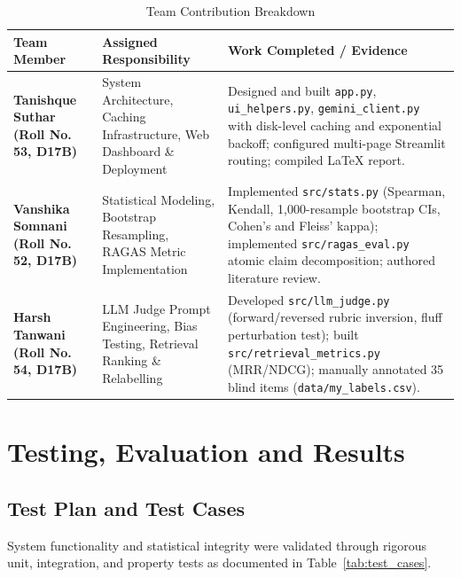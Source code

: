 \documentclass[11pt,a4paper]{article}
\renewcommand{\arraystretch}{1.2}
\begin{document}
\begin{table}[htbp]
\centering
\caption{Team Contribution Breakdown}
\label{tab:team_contribution}
\footnotesize
\renewcommand{\arraystretch}{1.25}
\begin{tabularx}{\linewidth}{|>{\RaggedRight\bfseries}p{3.2cm}|>{\RaggedRight}p{4.2cm}|>{\RaggedRight}X|}
\hline
\rowcolor{tableheader}
Team Member & Assigned Responsibility & Work Completed / Evidence \\
\hline
\textbf{Tanishque Suthar} \newline (Roll No. 53, D17B) & System Architecture, Caching Infrastructure, Web Dashboard \& Deployment & Designed and built \texttt{app.py}, \texttt{ui\_helpers.py}, \texttt{gemini\_client.py} with disk-level caching and exponential backoff; configured multi-page Streamlit routing; compiled LaTeX report. \\
\hline
\textbf{Vanshika Somnani} \newline (Roll No. 52, D17B) & Statistical Modeling, Bootstrap Resampling, RAGAS Metric Implementation & Implemented \texttt{src/stats.py} (Spearman, Kendall, 1,000-resample bootstrap CIs, Cohen's and Fleiss' kappa); implemented \texttt{src/ragas\_eval.py} atomic claim decomposition; authored literature review. \\
\hline
\textbf{Harsh Tanwani} \newline (Roll No. 54, D17B) & LLM Judge Prompt Engineering, Bias Testing, Retrieval Ranking \& Relabelling & Developed \texttt{src/llm\_judge.py} (forward/reversed rubric inversion, fluff perturbation test); built \texttt{src/retrieval\_metrics.py} (MRR/NDCG); manually annotated 35 blind items (\texttt{data/my\_labels.csv}). \\
\hline
\end{tabularx}
\end{table}

\section{Testing, Evaluation and Results}

\subsection{Test Plan and Test Cases}
System functionality and statistical integrity were validated through rigorous unit, integration, and property tests as documented in Table~\ref{tab:test_cases}.
\end{document}
